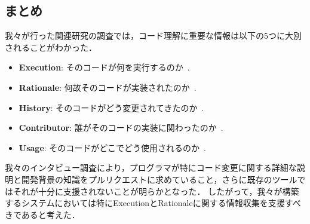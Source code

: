 
\subsection{まとめ}

我々が行った関連研究の調査では，コード理解に重要な情報は以下の5つに大別されることがわかった．



\begin{itemize}
\setlength{\itemsep}{0cm}
\item \textbf{Execution}: そのコードが何を実行するのか~\cite{Information_Needs_in_Collocated_Software_Development_Teams}.
\item \textbf{Rationale}: 何故そのコードが実装されたのか~\cite{Information_Needs_in_Collocated_Software_Development_Teams}.
\item \textbf{History}: そのコードがどう変更されてきたのか~\cite{Chronicler}.
\item \textbf{Contributor}: 誰がそのコードの実装に関わったのか~\cite{Who_can_help_me_with_this_source_code_change}.
\item \textbf{Usage}: そのコードがどこでどう使用されるのか~\cite{Six_Learning_Barriers_in_End_User_Programming_Systems}.
\end{itemize}


我々のインタビュー調査により，プログラマが特にコード変更に関する詳細な説明と開発背景の知識をプルリクエストに求めていること，さらに既存のツールではそれが十分に支援されないことが明らかとなった．
したがって，我々が構築するシステムにおいては特にExecutionとRationaleに関する情報収集を支援すべきであると考えた．









